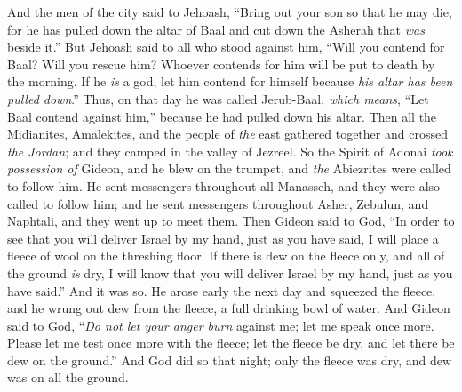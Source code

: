 \begin{biblechapter}
\verse And the men of the city said to Jehoash, “Bring out your son so that he may die, for he has pulled down the altar of Baal and cut down the Asherah that \textit{was} beside it.”
\verse But Jehoash said to all who stood against him, “Will you contend for Baal? Will you rescue him? Whoever contends for him will be put to death by the morning. If he \textit{is} a god, let him contend for himself because \textit{his altar has been pulled down}.”
\verse Thus, on that day he was called Jerub-Baal, \textit{which means}, “Let Baal contend against him,” because he had pulled down his altar.
\verse Then all the Midianites, Amalekites, and the people of \textit{the} east gathered together and crossed \textit{the Jordan}; and they camped in the valley of Jezreel.
\verse So the Spirit of Adonai \textit{took possession of} Gideon, and he blew on the trumpet, and \textit{the} Abiezrites were called to follow him.
\verse He sent messengers throughout all Manasseh, and they were also called to follow him; and he sent messengers throughout Asher, Zebulun, and Naphtali, and they went up to meet them.
 Then Gideon said to God, “In order to see that you will deliver Israel by my hand, just as you have said,
\verse I will place a fleece of wool on the threshing floor. If there is dew on the fleece only, and all of the ground \textit{is} dry, I will know that you will deliver Israel by my hand, just as you have said.”
\verse And it was so. He arose early the next day and squeezed the fleece, and he wrung out dew from the fleece, a full drinking bowl of water.
\verse And Gideon said to God, “\textit{Do not let your anger burn} against me; let me speak once more. Please let me test once more with the fleece; let the fleece be dry, and let there be dew on the ground.”
\verse And God did so that night; only the fleece was dry, and dew was on all the ground.
\end{biblechapter}

